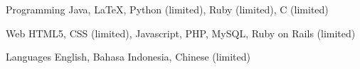 


\begin{cvskills}


\cvskill
{Programming} %
{Java, LaTeX, Python (limited), Ruby (limited), C (limited)} %


\cvskill
{Web} %
{HTML5, CSS (limited), Javascript, PHP, MySQL, Ruby on Rails (limited)} %


\cvskill
{Languages} %
{English, Bahasa Indonesia, Chinese (limited)} %


\end{cvskills}